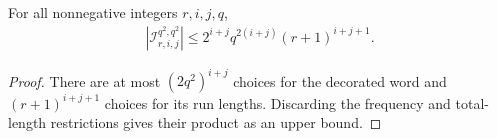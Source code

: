 \begin{lemma}
    \label{thm:two_marker_middle_cardinality}
    \leanok
    For all nonnegative integers $r,i,j,q$,
    \begin{align}
        |\mathcal I_{r,i,j}^{q^2,q^2}|
        \le 2^{i+j}q^{2(i+j)}(r+1)^{i+j+1}.
        \label{eq:two_marker_middle_cardinality}
    \end{align}
\end{lemma}
\begin{proof}\leanok
    There are at most $(2q^2)^{i+j}$ choices for the decorated word and
    $(r+1)^{i+j+1}$ choices for its run lengths. Discarding the frequency and
    total-length restrictions gives their product as an upper bound.
\end{proof}
